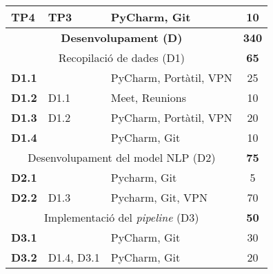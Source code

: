 {{\begin{table}[H]
\begin{tabular}{|cllc|}
\multicolumn{1}{|l|}{\textbf{TP4}}          & \multicolumn{1}{l|}{TP3}                      & \multicolumn{1}{l|}{PyCharm, Git}   & 10                       \\ \hline
\hline
\multicolumn{3}{|c|}{\textbf{Desenvolupament (D)}}                                  & \textbf{340}             \\ \hline
                                              \multicolumn{3}{|c|}{Recopilació de dades (D1)}                                     & \textbf{65}              \\ \hline
\multicolumn{1}{|l|}{\textbf{D1.1}}         & \multicolumn{1}{l|}{}                      & \multicolumn{1}{l|}{PyCharm, Portàtil, VPN} & 25                       \\ \hline
\multicolumn{1}{|l|}{\textbf{D1.2}}         & \multicolumn{1}{l|}{D1.1}                      & \multicolumn{1}{l|}{Meet, Reunions}    & 10                       \\ \hline
\multicolumn{1}{|l|}{\textbf{D1.3}}         & \multicolumn{1}{l|}{D1.2}                      & \multicolumn{1}{l|}{PyCharm, Portàtil, VPN}    & 20                       \\ \hline
\multicolumn{1}{|l|}{\textbf{D1.4}}         & \multicolumn{1}{l|}{}                      & \multicolumn{1}{l|}{PyCharm, Git}    & 10                       \\ \hline
                                              \multicolumn{3}{|c|}{Desenvolupament del model NLP (D2)}                            & \textbf{75}              \\ \hline
\multicolumn{1}{|l|}{\textbf{D2.1}}         & \multicolumn{1}{l|}{}                      & \multicolumn{1}{l|}{Pycharm, Git}   & 5                        \\ \hline
\multicolumn{1}{|l|}{\textbf{D2.2}}         & \multicolumn{1}{l|}{D1.3}                      & \multicolumn{1}{l|}{Pycharm, Git, VPN} & 70                       \\ \hline
                                              \multicolumn{3}{|c|}{Implementació del \textit{pipeline} (D3)}         & \textbf{50}              \\ \hline
\multicolumn{1}{|l|}{\textbf{D3.1}}         & \multicolumn{1}{l|}{}                      & \multicolumn{1}{l|}{PyCharm, Git}              & 30                       \\ \hline
\multicolumn{1}{|l|}{\textbf{D3.2}}         & \multicolumn{1}{l|}{D1.4, D3.1}                      & \multicolumn{1}{l|}{PyCharm, Git}        & 20                       \\ \hline

\end{tabular}
\end{table}}}
